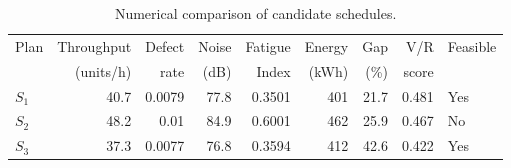 \begin{table}[htbp]
\centering
\caption{Numerical comparison of candidate schedules.}
\label{tab:numerical-sim}
\small
\begin{tabular}{@{}lrrrrrrrl@{}}
\toprule
Plan & Throughput & Defect & Noise & Fatigue & Energy & Gap & V/R & Feasible \\
     & (units/h)  & rate   & (dB)  & Index   & (kWh)  & (\%) & score &         \\
\midrule
$S_{1}$ & 40.7 & 0.0079 & 77.8 & 0.3501 & 401 & 21.7 & 0.481 & Yes \\
$S_{2}$ & 48.2 & 0.01 & 84.9 & 0.6001 & 462 & 25.9 & 0.467 & No \\
$S_{3}$ & 37.3 & 0.0077 & 76.8 & 0.3594 & 412 & 42.6 & 0.422 & Yes \\
\bottomrule
\end{tabular}
\end{table}
